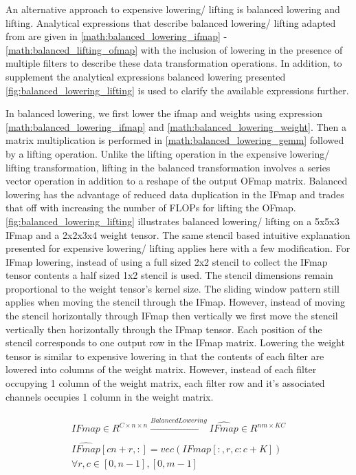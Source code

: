 An alternative approach to expensive lowering/ lifting is balanced lowering and
lifting. Analytical expressions that describe balanced lowering/ lifting adapted
from \cite{cafe_con_troll} are given in \eqref{math:balanced_lowering_ifmap} -
\eqref{math:balanced_lifting_ofmap} with the inclusion of lowering in the
presence of multiple filters to describe these data transformation operations.
In addition, to supplement the analytical expressions balanced lowering
presented \autoref{fig:balanced_lowering_lifting} is used to clarify the
available expressions further.  

In balanced lowering, we first lower the ifmap and weights using expression
\eqref{math:balanced_lowering_ifmap} and \eqref{math:balanced_lowering_weight}.
Then a matrix multiplication is performed in \eqref{math:balanced_lowering_gemm}
followed by a lifting operation. Unlike the lifting operation in the expensive
lowering/ lifting transformation, lifting in the balanced transformation
involves a series vector operation in addition to a reshape of the output OFmap
matrix. Balanced lowering has the advantage of reduced data duplication in the
IFmap and trades that off with increasing the number of FLOPs for lifting the
OFmap. \autoref{fig:balanced_lowering_lifting} illustrates balanced lowering/
lifting on a 5x5x3 IFmap and a 2x2x3x4 weight tensor. The same stencil based
intuitive explanation presented for expensive lowering/ lifting applies here
with a few modification. For IFmap lowering, instead of using a full sized 2x2
stencil to collect the IFmap tensor contents a half sized 1x2 stencil is used.
The stencil dimensions remain proportional to the weight tensor's kernel size.
The sliding window pattern still applies when moving the stencil through the
IFmap. However, instead of moving the stencil horizontally through IFmap then
vertically we first move the stencil vertically then horizontally through the
IFmap tensor. Each position of the stencil corresponds to one output row in the
IFmap matrix. Lowering the weight tensor is similar to expensive lowering in
that the contents of each filter are lowered into columns of the weight matrix.
However, instead of each filter occupying 1 column of the weight matrix, each
filter row and it's associated channels occupies 1 column in the weight matrix.  
 
\begin{align}
    \begin{gathered}
        IFmap \in R^{C\times n\times n} \xrightarrow[]{Balanced Lowering} \hat{IFmap} \in R^{nm\times KC} \\
        \hat{IFmap}[cn+r, :] = vec(IFmap[:, r, c:c+K]) \\
        \forall r,c \in [0, n-1], [0, m-1]
    \end{gathered}
    \label{math:balanced_lowering_ifmap}
\end{align}

